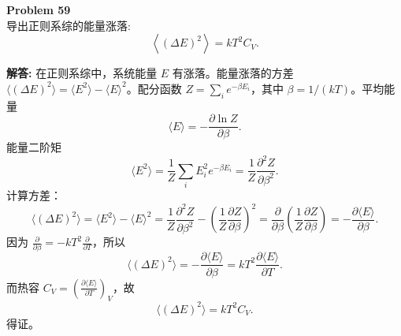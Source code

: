 \documentclass[12pt, a4paper, oneside]{ctexart}
\newenvironment{solution}{\par\noindent\textbf{解答:}\quad}{\par}
\begin{document}
\begin{mdframed}[backgroundcolor=gray!10, linewidth=0pt]
    \textbf{Problem 59} \\
    导出正则系综的能量涨落:
    \[
    \left\langle (\Delta E)^2 \right\rangle = k T^2 C_V.
    \]
\end{mdframed}
\begin{solution}
    在正则系综中，系统能量 $E$ 有涨落。能量涨落的方差 $\langle (\Delta E)^2 \rangle = \langle E^2 \rangle - \langle E \rangle^2$。配分函数 $Z = \sum_i e^{-\beta E_i}$，其中 $\beta = 1/(kT)$。平均能量
    \[
    \langle E \rangle = -\frac{\partial \ln Z}{\partial \beta}.
    \]
    能量二阶矩
    \[
    \langle E^2 \rangle = \frac{1}{Z} \sum_i E_i^2 e^{-\beta E_i} = \frac{1}{Z} \frac{\partial^2 Z}{\partial \beta^2}.
    \]
    计算方差：
    \[
    \langle (\Delta E)^2 \rangle = \langle E^2 \rangle - \langle E \rangle^2 = \frac{1}{Z} \frac{\partial^2 Z}{\partial \beta^2} - \left( \frac{1}{Z} \frac{\partial Z}{\partial \beta} \right)^2 = \frac{\partial}{\partial \beta} \left( \frac{1}{Z} \frac{\partial Z}{\partial \beta} \right) = -\frac{\partial \langle E \rangle}{\partial \beta}.
    \]
    因为 $\frac{\partial}{\partial \beta} = -k T^2 \frac{\partial}{\partial T}$，所以
    \[
    \langle (\Delta E)^2 \rangle = -\frac{\partial \langle E \rangle}{\partial \beta} = k T^2 \frac{\partial \langle E \rangle}{\partial T}.
    \]
    而热容 $C_V = \left( \frac{\partial \langle E \rangle}{\partial T} \right)_V$，故
    \[
    \langle (\Delta E)^2 \rangle = k T^2 C_V.
    \]
    得证。
\end{solution}
\end{document}
